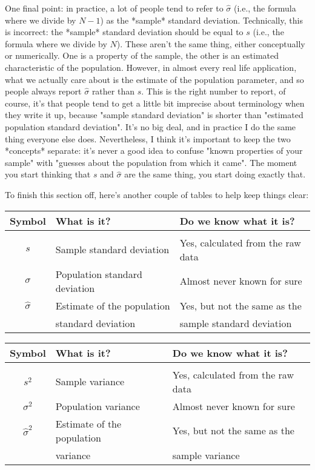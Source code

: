 One final point: in practice, a lot of people tend to refer to $\hat{\sigma}$ (i.e., the formula where we divide by $N-1$) as the *sample* standard deviation. Technically, this is incorrect: the *sample* standard deviation should be equal to $s$ (i.e., the formula where we divide by $N$). These aren't the same thing, either conceptually or numerically. One is a property of the sample, the other is an estimated characteristic of the population. However, in almost every real life application, what we actually care about is the estimate of the population parameter, and so people always report $\hat\sigma$ rather than $s$. This is the right number to report, of course, it's that people tend to get a little bit imprecise about terminology when they write it up, because "sample standard deviation" is shorter than "estimated population standard deviation". It's no big deal, and in practice I do the same thing everyone else does. Nevertheless, I think it's important to keep the two *concepts* separate: it's never a good idea to confuse "known properties of your sample" with "guesses about the population from which it came". The moment you start thinking that $s$ and $\hat\sigma$ are the same thing, you start doing exactly that. 

To finish this section off, here's another couple of tables to help keep things clear:

\begin{center}
\small 
\begin{tabular}{cll}
Symbol & What is it? & Do we know what it is? \\ \hline \\[-6pt]
$s$ & Sample standard deviation & Yes, calculated from the raw data \\
$\sigma$ & Population standard deviation & Almost never known for sure \\
$\hat{\sigma}$ & Estimate of the population  & Yes, but not the same as the  \\
 & standard deviation & sample standard deviation
\end{tabular}
\end{center}

\begin{center}
\small 
\begin{tabular}{cll}
Symbol & What is it? & Do we know what it is? \\ \hline \\[-6pt]
$s^2$ & Sample variance & Yes, calculated from the raw data \\
$\sigma^2$ & Population variance & Almost never known for sure \\
$\hat{\sigma}^2$ & Estimate of the population  & Yes, but not the same as the  \\
 & variance & sample variance
\end{tabular}
\end{center}




